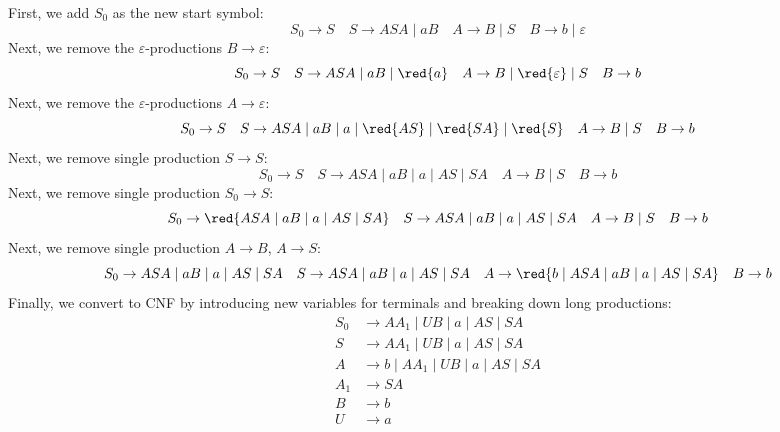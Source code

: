 First, we add $S_0$ as the new start symbol:
\[
    S_0 \to S \quad  S \to ASA \mid aB \quad A \to B \mid S \quad B \to b \mid \varepsilon
\]
Next, we remove the $\varepsilon$-productions $B \to \varepsilon$:
\[
    S_0 \to S \quad S \to ASA \mid aB \mid \red{a} \quad A \to B \mid \red{\varepsilon} \mid S \quad B \to b
\]
Next, we remove the $\varepsilon$-productions $A \to \varepsilon$:
\[
    S_0 \to S \quad S \to ASA \mid aB \mid a \mid \red{AS} \mid \red{SA} \mid \red{S} \quad A \to B \mid S \quad B \to b
\]
Next, we remove single production $S \to S$:
\[
    S_0 \to S \quad S \to ASA \mid aB \mid a \mid AS \mid SA \quad A \to B \mid S \quad B \to b
\]
Next, we remove single production $S_0 \to S$:
\[
    S_0 \to \red{ASA \mid aB \mid a \mid AS \mid SA} \quad S \to ASA \mid aB \mid a \mid AS \mid SA \quad A \to B \mid S \quad B \to b
\]
Next, we remove single production $A \to B$, $A \to S$:
\[
    S_0 \to ASA \mid aB \mid a \mid AS \mid SA \quad S \to ASA \mid aB \mid a \mid AS \mid SA \quad A \to \red{b \mid ASA \mid aB \mid a \mid AS \mid SA} \quad B \to b
\]
Finally, we convert to CNF by introducing new variables for terminals and breaking down long productions:
\begin{align*}
    S_0 &\to AA_1 \mid U B \mid a \mid A S \mid S A \\
    S &\to AA_1 \mid U B \mid a \mid A S \mid S A \\
    A &\to b \mid AA_1 \mid U B \mid a \mid A S \mid S A \\
    A_1 &\to SA \\
    B &\to b \\
    U &\to a
\end{align*}

